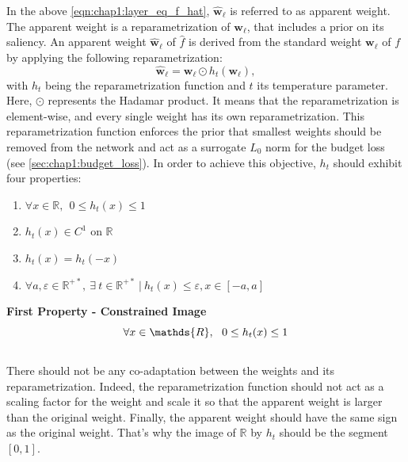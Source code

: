 \noindent In the above \cref{eqn:chap1:layer_eq_f_hat}, $\mathbf{\hat w}_\ell$
is referred to as apparent weight. The apparent weight is a reparametrization of
$\mathbf{w}_\ell$, that includes a prior on its saliency. An apparent weight
$\mathbf{\hat w}_\ell$ of $\hat{f}$ is derived from the standard weight
$\mathbf{w}_\ell$ of $f$ by applying the following reparametrization: 
\begin{equation}
  \label{eqn:reparam}
  \mathbf{\hat w}_\ell = \mathbf{w}_\ell  \odot h_t(\mathbf{w}_\ell),
\end{equation}
\noindent with $h_t$ being the reparametrization function and $t$ its
temperature parameter. Here, $\odot$ represents the Hadamar product. It means
that the reparametrization is element-wise, and every single weight has its own
reparametrization. This reparametrization function enforces the prior that
smallest weights should be removed from the network and act as a surrogate $L_0$
norm for the budget loss (see \cref{sec:chap1:budget_loss}). In order to achieve
this objective, $h_t$ should exhibit four properties: \\

\begin{enumerate}
  \item $\forall x \in \mathds{R},~~ 0 \leq h_t(x) \leq 1 $
  \item $h_t(x) \in C^1 \text{ on } \mathds{R}$
  \item $h_t(x) = h_t(-x)$
  \item $\forall a,\varepsilon \in\mathds{R}^{+\ast},~ \exists ~t
  \in\mathds{R}^{+\ast} ~ | ~ h_t(x) \leq \varepsilon, x \in [-a,a]$
\end{enumerate}

\noindent\textbf{First Property - Constrained Image} \\
\begin{equation}
    \centering
    \forall x \in \mathds{R},~~ 0 \leq h_t(x) \leq 1
    \label{eqn:chap1:reparam_prop1}
\end{equation}
\\
There should not be any co-adaptation between the weights and its
reparametrization. Indeed, the reparametrization function should not act as a
scaling factor for the weight and scale it so that the apparent weight is larger
than the original weight. Finally, the apparent weight should have the same sign
as the original weight. That's why the image of $\mathbb{R}$ by $h_t$ should be
the segment $[0,1]$.\\

